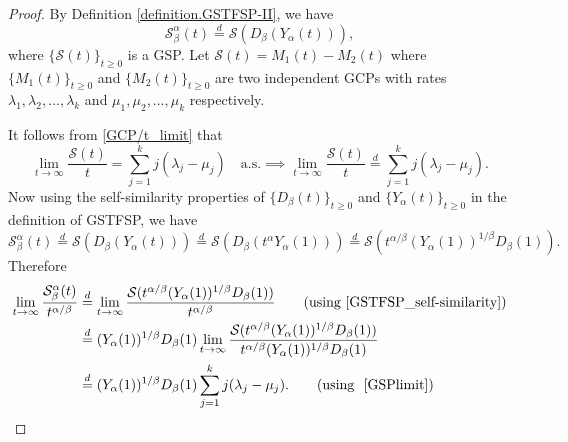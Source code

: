 \documentclass[11pt,oneside,reqno]{amsart}
\theoremstyle{definition}
\theoremstyle{remarkstyle}
\begin{document}
\begin{proof}
By Definition \eqref{definition.GSTFSP-II}, we have 
\begin{equation*}
    \mathcal{S}_{\beta}^{\alpha}(t)\overset{d}{=}\mathcal{S}(D_\beta(Y_\alpha(t))),
\end{equation*} 
where $\{\mathcal{S}(t)\}_{t\geq 0}$ is a GSP. Let $\mathcal{S}(t)=M_1(t)-M_2(t)$ where $\{M_1(t)\}_{t\geq 0}$ and $\{M_2(t)\}_{t\geq 0}$ are two independent GCPs with rates $\lambda_1,\lambda_2,\dots,\lambda_k$ and $\mu_1,\mu_2,\dots,\mu_k$ respectively.

 It follows from \eqref{GCP/t_limit} that
\begin{equation}
    \lim_{t\rightarrow \infty}\frac{\mathcal{S}(t)}{t}=\sum_{j=1}^{k}j(\lambda_j-\mu_j)\quad\text{a.s.}\implies\lim_{t\rightarrow \infty}\frac{\mathcal{S}(t)}{t}\overset{d}{=}\sum_{j=1}^{k}j(\lambda_j-\mu_j).\label{GSPlimit}
\end{equation}
Now using the self-similarity properties of $\{D_\beta(t)\}_{t\geq 0}$ and $\{Y_\alpha(t)\}_{t \geq 0}$ in the definition of GSTFSP, we have
\begin{equation}\label{GSTFSP_self-similarity} \mathcal{S}_{\beta}^\alpha(t)\overset{d}{=}\mathcal{S}(D_\beta(Y_\alpha(t)))\overset{d}{=}\mathcal{S}(D_\beta(t^\alpha Y_\alpha(1)))\overset{d}{=}\mathcal{S}(t^{\alpha/\beta}(Y_\alpha(1))^{1/\beta}D_\beta(1)).
\end{equation}
Therefore
\begin{align}
    \lim_{t\rightarrow \infty}\frac{\mathcal{S}_{\beta}^\alpha(t)}{t^{\alpha/\beta}}&\overset{d}{=}\lim_{t\rightarrow \infty}\frac{\mathcal{S}(t^{\alpha/\beta}(Y_\alpha(1))^{1/\beta}D_\beta(1))}{t^{\alpha/{\beta}}}\qquad(\text{using}~\eqref{GSTFSP_self-similarity})\nonumber\\
    &\overset{d}{=}(Y_\alpha(1))^{1/\beta}D_\beta(1)\lim_{t\rightarrow \infty}\frac{\mathcal{S}(t^{\alpha/\beta}(Y_\alpha(1))^{1/\beta}D_\beta(1))}{t^{\alpha/\beta}(Y_\alpha(1))^{1/\beta}D_\beta(1)}\nonumber\\
    &\overset{d}{=}(Y_\alpha(1))^{1/\beta}D_\beta(1)\sum_{j=1}^{k}j(\lambda_j-\mu_j). \qquad(\text{using~ \eqref{GSPlimit}}) \nonumber
\end{align}
\end{proof}
\end{document}
